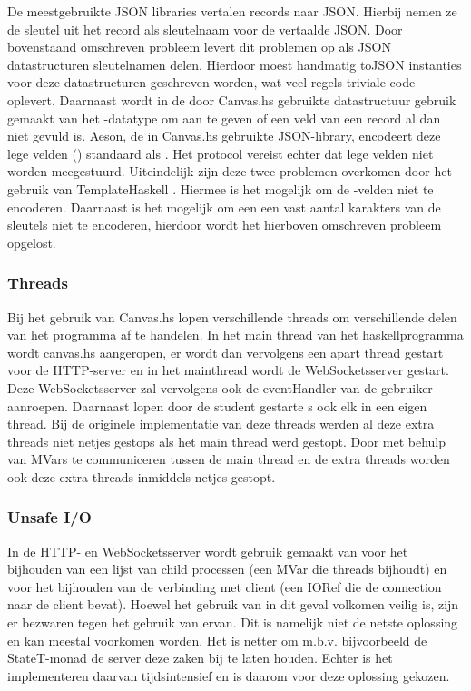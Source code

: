 De meestgebruikte JSON libraries vertalen records naar JSON. Hierbij nemen ze de sleutel uit het record als sleutelnaam voor de vertaalde JSON. Door bovenstaand omschreven probleem levert dit problemen op als JSON datastructuren sleutelnamen delen. Hierdoor moest handmatig toJSON instanties voor deze datastructuren geschreven worden, wat veel regels triviale code oplevert. Daarnaast wordt in de door Canvas.hs gebruikte datastructuur gebruik gemaakt van het -datatype om aan te geven of een veld van een record al dan niet gevuld is. Aeson, de in Canvas.hs gebruikte JSON-library, encodeert deze lege velden () standaard als . Het protocol vereist echter dat lege velden niet worden meegestuurd. Uiteindelijk zijn deze twee problemen overkomen door het gebruik van TemplateHaskell \cite{AesonTH}. Hiermee is het mogelijk om de -velden niet te encoderen. Daarnaast is het mogelijk om een een vast aantal karakters van de sleutels niet te encoderen, hierdoor wordt het hierboven omschreven probleem opgelost. 


\subsubsection{Threads}
Bij het gebruik van Canvas.hs lopen verschillende threads om verschillende delen van het programma af te handelen. In het main thread van het haskellprogramma wordt canvas.hs aangeropen, er wordt dan vervolgens een apart thread gestart voor de HTTP-server en in het mainthread wordt de WebSocketsserver gestart. Deze WebSocketsserver zal vervolgens ook de eventHandler van de gebruiker aanroepen. Daarnaast lopen door de student gestarte s ook elk in een eigen thread. Bij de originele implementatie van deze threads werden al deze extra threads niet netjes gestops als het main thread werd gestopt. Door met behulp van MVars te communiceren tussen de main thread en de extra threads worden ook deze extra threads inmiddels netjes gestopt.

\subsubsection{Unsafe I/O}
In de HTTP- en WebSocketsserver wordt gebruik gemaakt van  voor het bijhouden van een lijst van child processen (een MVar die threads bijhoudt) en voor het bijhouden van de verbinding met client (een IORef die de connection naar de client bevat). Hoewel het gebruik van  in dit geval volkomen veilig is, zijn er bezwaren tegen het gebruik van ervan\cite{Haskell.org2008}. Dit is namelijk niet de netste oplossing en kan meestal voorkomen worden. Het is netter om m.b.v. bijvoorbeeld de StateT-monad de server deze zaken bij te laten houden. Echter is het implementeren daarvan tijdsintensief en is daarom voor deze oplossing gekozen.